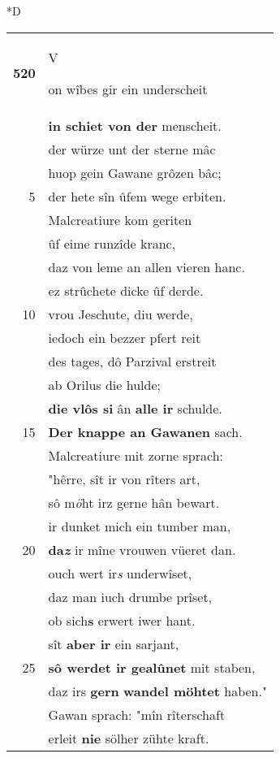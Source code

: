 \documentclass[8pt,a4paper,notitlepage]{article}
\begin{document}
\begin{table}[ht]
\begin{minipage}[t]{0.5\linewidth}
\small
\begin{center}*D
\end{center}
\begin{tabular}{rl}
\textbf{520} & \begin{large}V\end{large}on wîbes gir ein underscheit\\ 
 & \textbf{in schiet von der} menscheit.\\ 
 & der würze unt der sterne mâc\\ 
 & huop gein Gawane grôzen bâc;\\ 
5 & der hete sîn ûfem wege erbiten.\\ 
 & Malcreatiure kom geriten\\ 
 & ûf eime runzîde kranc,\\ 
 & daz von leme an allen vieren hanc.\\ 
 & ez strûchete dicke ûf derde.\\ 
10 & vrou Jeschute, diu werde,\\ 
 & iedoch ein bezzer pfert reit\\ 
 & des tages, dô Parzival erstreit\\ 
 & ab Orilus die hulde;\\ 
 & \textbf{die vlôs si} ân \textbf{alle ir} schulde.\\ 
15 & \textbf{Der knappe an Gawanen} sach.\\ 
 & Malcreatiure mit zorne sprach:\\ 
 & "hêrre, sît ir von rîters art,\\ 
 & sô m\textit{ö}ht irz gerne hân bewart.\\ 
 & ir dunket mich ein tumber man,\\ 
20 & \textbf{da\textit{z}} ir mîne vrouwen vüeret dan.\\ 
 & ouch wert ir\textit{s} underwîset,\\ 
 & daz man iuch drumbe prîset,\\ 
 & ob sich\textbf{s} erwert iwer hant.\\ 
 & sît \textbf{aber ir} ein sarjant,\\ 
25 & \textbf{sô werdet ir gealûnet} mit staben,\\ 
 & daz irs \textbf{gern} \textbf{wandel möhtet} haben."\\ 
 & Gawan sprach: "mîn rîterschaft\\ 
 & erleit \textbf{nie} sölher zühte kraft.\\ 

\end{tabular}
\end{minipage}
\end{table}
\end{document}

